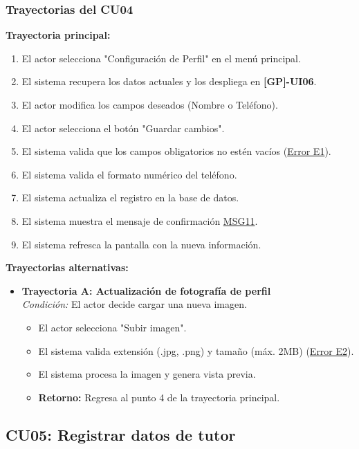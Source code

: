 \begin{appendices}
\subsubsection{Trayectorias del CU04}

\textbf{Trayectoria principal:}
\begin{enumerate}[nosep]
    \item El actor selecciona "Configuración de Perfil" en el menú principal.
    \item El sistema recupera los datos actuales y los despliega en \textbf{[GP]-UI06}.
    \item El actor modifica los campos deseados (Nombre o Teléfono).
    \item El actor selecciona el botón "Guardar cambios".
    \item El sistema valida que los campos obligatorios no estén vacíos (\hyperlink{msg:MSG02}{Error E1}).
    \item El sistema valida el formato numérico del teléfono.
    \item El sistema actualiza el registro en la base de datos.
    \item El sistema muestra el mensaje de confirmación \hyperlink{msg:MSG11}{MSG11}.
    \item El sistema refresca la pantalla con la nueva información.
\end{enumerate}

\textbf{Trayectorias alternativas:}
\begin{itemize}[leftmargin=*]
    \item \textbf{Trayectoria A: Actualización de fotografía de perfil} \\
    \textit{Condición:} El actor decide cargar una nueva imagen.
    \begin{itemize}[nosep]
        \item[A-1:] El actor selecciona "Subir imagen".
        \item[A-2:] El sistema valida extensión (.jpg, .png) y tamaño (máx. 2MB) (\hyperlink{err:E7}{Error E2}).
        \item[A-3:] El sistema procesa la imagen y genera vista previa.
        \item \textbf{Retorno:} Regresa al punto 4 de la trayectoria principal.
    \end{itemize}
\end{itemize}

\subsection{CU05: Registrar datos de tutor}


\end{appendices}

